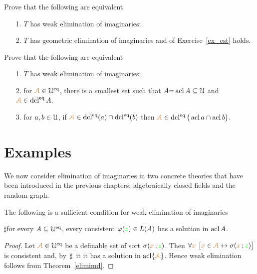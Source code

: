 \documentclass[creche.tex]{subfiles}
\begin{document}
  
  \begin{exercise}\label{ex_wei=est+gei}
    Prove that the following are equivalent
    \begin{itemize}
    \item[1.]  $T$ has weak elimination of imaginaries;
    \item[2.]  $T$ has geometric elimination of imaginaries and  of Exercise~\ref{ex_est} holds.\QED
    \end{itemize} 
  \end{exercise}
  
  \begin{example}
    Prove that the following are equivalent
    \begin{itemize}
    \item[1.] $T$ has weak elimination of imaginaries;
    \item[2.] for ${\color{brown}\EuScript A}\in \EuScript U^{{\rm eq}}$, there is a smallest set such that $A{=}\mathop{\rm acl} A\subseteq\EuScript U$ and ${\color{brown}\EuScript A}\in\mathop{\rm dcl}^{{\rm eq}} A$.
    
    \item[3.] for $a,b\in\EuScript U$, if ${\color{brown}\EuScript A}\in\mathop{\rm dcl}^{{\rm eq}}(a)\cap\mathop{\rm dcl}^{{\rm eq}}(b)$ then ${\color{brown}\EuScript A}\in\mathop{\rm dcl}^{{\rm eq}}\big(\mathop{\rm acl} a\cap\mathop{\rm acl} b\big)$.\QED
    \end{itemize} 
  \end{example}

\section{Examples}

We now consider elimination of imaginaries in two concrete theories that have been introduced in the previous chapters: 
algebraically closed fields and the random graph.

\begin{lemma}\label{tvtestimmaginari}
The following is a sufficient condition for weak elimination of imaginaries

$\sharp$\qquad for every $A\subseteq\EuScript U^{{\rm eq}}$, every consistent $\varphi({\color{green} z})\in L(A)$ has a solution in $\mathop{\rm acl} A$.
\end{lemma}

\begin{proof}
Let ${\color{brown}\EuScript A}\in\EuScript U^{{\rm eq}}$ be a definable set of sort $\sigma({\color{brown} x}\,;{\color{green} z})$.
Then $\forall{\color{brown}x}\ \big[{\color{brown} x}\in{\color{brown}\EuScript A}\leftrightarrow\sigma({\color{brown} x}\,;{\color{green} z})\big]$ is consistent and, by $\,\sharp\,$ it  it has a solution in $\mathop{\rm acl}\{{\color{brown}\EuScript A}\}$.
Hence weak elimination follows from Theorem~\ref{elimimd}.
\end{proof}
\end{document}
